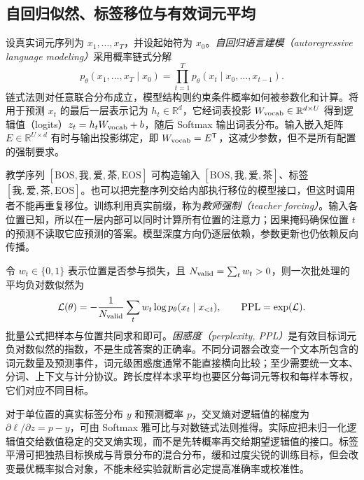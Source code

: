 \documentclass[UTF8,12pt,a4paper,fontset=fandol]{ctexart}
\begin{document}
\subsection{自回归似然、标签移位与有效词元平均}

设真实词元序列为 $x_1,\ldots,x_T$，并设起始符为 $x_0$。\emph{自回归语言建模（autoregressive language modeling）}采用概率链式分解
\begin{equation}
p_\theta(x_1,\ldots,x_T\mid x_0)
=\prod_{t=1}^T p_\theta(x_t\mid x_0,\ldots,x_{t-1}).
\label{eq:tr-autoreg}
\end{equation}
链式法则对任意联合分布成立，模型结构则约束条件概率如何被参数化和计算。将用于预测 $x_t$ 的最后一层表示记为 $h_t\in\mathbb R^d$，它经词表投影 $W_{\rm vocab}\in\mathbb R^{d\times U}$ 得到逻辑值（logits）$z_t=h_tW_{\rm vocab}+b$，随后 Softmax 输出词表分布。输入嵌入矩阵 $E\in\mathbb R^{U\times d}$ 有时与输出投影绑定，即 $W_{\rm vocab}=E^{\mathsf T}$，这减少参数，但不是所有配置的强制要求。

教学序列 $[\mathrm{BOS},\text{我},\text{爱},\text{茶},\mathrm{EOS}]$ 可构造输入 $[\mathrm{BOS},\text{我},\text{爱},\text{茶}]$、标签 $[\text{我},\text{爱},\text{茶},\mathrm{EOS}]$。也可以把完整序列交给内部执行移位的模型接口，但这时调用者不能再重复移位。训练利用真实前缀，称为\emph{教师强制（teacher forcing）}。输入各位置已知，所以在一层内部可以同时计算所有位置的注意力；因果掩码确保位置 $t$ 的预测不读取它应预测的答案。模型深度方向仍逐层依赖，参数更新也仍依赖反向传播。

令 $w_t\in\{0,1\}$ 表示位置是否参与损失，且 $N_{\rm valid}=\sum_t w_t>0$，则一次批处理的平均负对数似然为
\begin{equation}
\mathcal L(\theta)=-\frac{1}{N_{\rm valid}}
\sum_t w_t\log p_\theta(x_t\mid x_{<t}),
\qquad \operatorname{PPL}=\exp(\mathcal L).
\label{eq:tr-loss}
\end{equation}
批量公式把样本与位置共同求和即可。\emph{困惑度（perplexity, PPL）}是有效目标词元负对数似然的指数，不是生成答案的正确率。不同分词器会改变一个文本所包含的词元数量及预测事件，词元级困惑度通常不能直接横向比较；至少需要统一文本、分词、上下文与计分协议。跨长度样本求平均也要区分每词元等权和每样本等权，它们对应不同目标。

对于单位置的真实标签分布 $y$ 和预测概率 $p$，交叉熵对逻辑值的梯度为 $\partial\ell/\partial z=p-y$，可由 Softmax 雅可比与对数链式法则推得。实际应把未归一化逻辑值交给数值稳定的交叉熵实现，而不是先转概率再交给期望逻辑值的接口。标签平滑可把独热目标换成与背景分布的混合分布，缓和过度尖锐的训练目标，但会改变最优概率拟合对象，不能未经实验就断言必定提高准确率或校准性。
\end{document}
